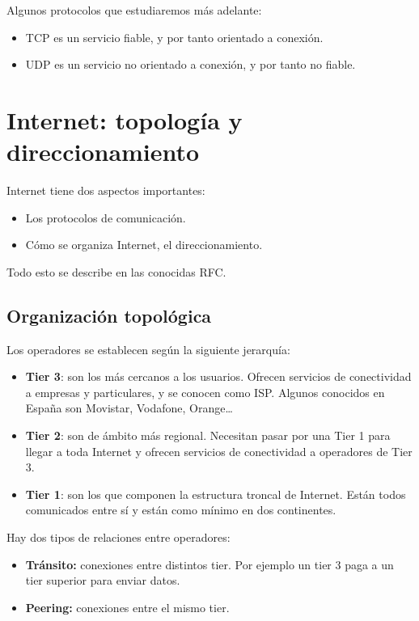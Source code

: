     Algunos protocolos que estudiaremos más adelante: 
    \begin{itemize}
        \item \acrshort{TCP} es un servicio fiable, y por tanto orientado a conexión.
        \item \acrshort{UDP} es un servicio no orientado a conexión, y por tanto no fiable.
    \end{itemize}


\section{Internet: topología y direccionamiento}
Internet tiene dos aspectos importantes:
\begin{itemize}
    \item Los protocolos de comunicación.
    \item Cómo se organiza Internet, el direccionamiento.
\end{itemize}
Todo esto se describe en las conocidas \acrfull{RFC}.

\subsection{Organización topológica}

Los operadores se establecen según la siguiente jerarquía:
\begin{itemize}
    \item \textbf{Tier 3}: son los más cercanos a los usuarios. Ofrecen servicios de conectividad a empresas y particulares, y se conocen como \acrfull{ISP}. Algunos conocidos en España son Movistar, Vodafone, Orange\ldots
    \item \textbf{Tier 2}: son de ámbito más regional. Necesitan pasar por una Tier 1 para llegar a toda Internet y ofrecen servicios de conectividad a operadores de Tier 3.
    \item \textbf{Tier 1}: son los que componen la estructura troncal de Internet. Están todos comunicados entre sí y están como mínimo en dos continentes. 
\end{itemize}

Hay dos tipos de relaciones entre operadores:
\begin{itemize}
    \item \textbf{Tránsito:} conexiones entre distintos tier. Por ejemplo un tier 3 paga a un tier superior para enviar datos. 
    \item \textbf{Peering:} conexiones entre el mismo tier. 
\end{itemize}

